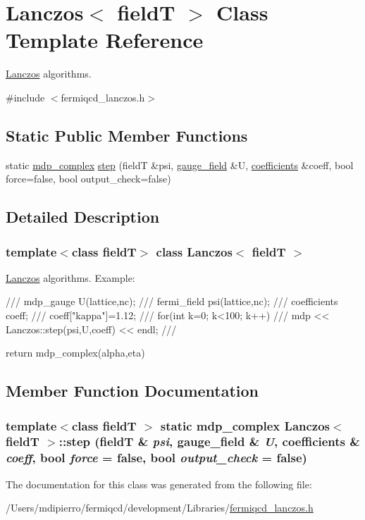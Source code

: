 \hypertarget{class_lanczos}{
\section{Lanczos$<$ fieldT $>$ Class Template Reference}
\label{class_lanczos}
}


\hyperlink{class_lanczos}{Lanczos} algorithms.  


{\ttfamily \#include $<$fermiqcd\_\-lanczos.h$>$}\subsection*{Static Public Member Functions}
\begin{DoxyCompactItemize}
\item 
static \hyperlink{classmdp__complex}{mdp\_\-complex} \hyperlink{class_lanczos_a955801bdbd7665b16d35b60de725636e}{step} (fieldT \&psi, \hyperlink{classgauge__field}{gauge\_\-field} \&U, \hyperlink{classcoefficients}{coefficients} \&coeff, bool force=false, bool output\_\-check=false)
\end{DoxyCompactItemize}


\subsection{Detailed Description}
\subsubsection*{template$<$class fieldT$>$ class Lanczos$<$ fieldT $>$}

\hyperlink{class_lanczos}{Lanczos} algorithms. Example: \begin{DoxyVerb}
/// mdp_gauge U(lattice,nc);
/// fermi_field psi(lattice,nc);
/// coefficients coeff;
/// coeff["kappa"]=1.12;
/// for(int k=0; k<100; k++)
///    mdp << Lanczos::step(psi,U,coeff) << endl;
/// \end{DoxyVerb}
 return mdp\_\-complex(alpha,eta) 

\subsection{Member Function Documentation}
\hypertarget{class_lanczos_a955801bdbd7665b16d35b60de725636e}{
\subsubsection[{step}]{\setlength{\rightskip}{0pt plus 5cm}template$<$class fieldT $>$ static {\bf mdp\_\-complex} {\bf Lanczos}$<$ fieldT $>$::step (fieldT \& {\em psi}, \/  {\bf gauge\_\-field} \& {\em U}, \/  {\bf coefficients} \& {\em coeff}, \/  bool {\em force} = {\ttfamily false}, \/  bool {\em output\_\-check} = {\ttfamily false})}}
\label{class_lanczos_a955801bdbd7665b16d35b60de725636e}


The documentation for this class was generated from the following file:\begin{DoxyCompactItemize}
\item 
/Users/mdipierro/fermiqcd/development/Libraries/\hyperlink{fermiqcd__lanczos_8h}{fermiqcd\_\-lanczos.h}\end{DoxyCompactItemize}

